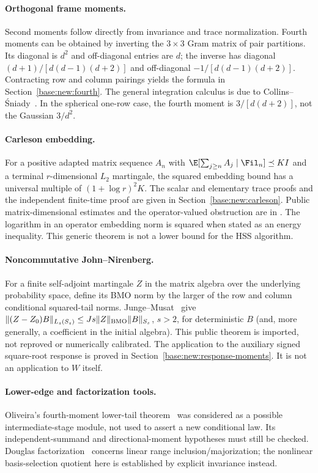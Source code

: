 \documentclass[11pt,oneside,openany,a4paper]{book}
\numberwithin{equation}{chapter}
\theoremstyle{definition}
\theoremstyle{remark}
\begin{document}
\paragraph{Orthogonal frame moments.}
Second moments follow directly from invariance and trace normalization. Fourth moments can be obtained by inverting the $3\times3$ Gram matrix of pair partitions. Its diagonal is $d^2$ and off-diagonal entries are $d$; the inverse has diagonal $(d+1)/[d(d-1)(d+2)]$ and off-diagonal $-1/[d(d-1)(d+2)]$. Contracting row and column pairings yields the formula in Section~\ref{base:new:fourth}. The general integration calculus is due to Collins--\'Sniady~\cite{CS}. In the spherical one-row case, the fourth moment is $3/[d(d+2)]$, not the Gaussian $3/d^2$.

\paragraph{Carleson embedding.}
For a positive adapted matrix sequence $A_n$ with
$\E[\sum_{j\ge n}A_j\mid\Fil_n]\preceq KI$ and a terminal $r$-dimensional $L_2$ martingale, the squared embedding bound has a universal multiple of $(1+\log r)^2K$. The scalar and elementary trace proofs and the independent finite-time proof are given in Section~\ref{base:new:carleson}. Public matrix-dimensional estimates and the operator-valued obstruction are in \cite{NTV,NPTV}. The logarithm in an operator embedding norm is squared when stated as an energy inequality. This generic theorem is not a lower bound for the HSS algorithm.

\paragraph{Noncommutative John--Nirenberg.}
For a finite self-adjoint martingale $Z$ in the matrix algebra over the underlying probability space, define its BMO norm by the larger of the row and column conditional squared-tail norms. Junge--Musat~\cite[Theorem 1.1 and definition (1.9)]{JM} give
$\|(Z-Z_0)B\|_{L_s(S_s)}\le Js\|Z\|_{\rm BMO}\|B\|_{S_s}$, $s>2$, for deterministic $B$ (and, more generally, a coefficient in the initial algebra). This public theorem is imported, not reproved or numerically calibrated. The application to the auxiliary signed square-root response is proved in Section~\ref{base:new:response-moments}. It is not an application to $W$ itself.

\paragraph{Lower-edge and factorization tools.}
Oliveira's fourth-moment lower-tail theorem~\cite{Oliveira} was considered as a possible intermediate-stage module, not used to assert a new conditional law. Its independent-summand and directional-moment hypotheses must still be checked. Douglas factorization~\cite{Douglas} concerns linear range inclusion/majorization; the nonlinear basis-selection quotient here is established by explicit invariance instead.
\end{document}
